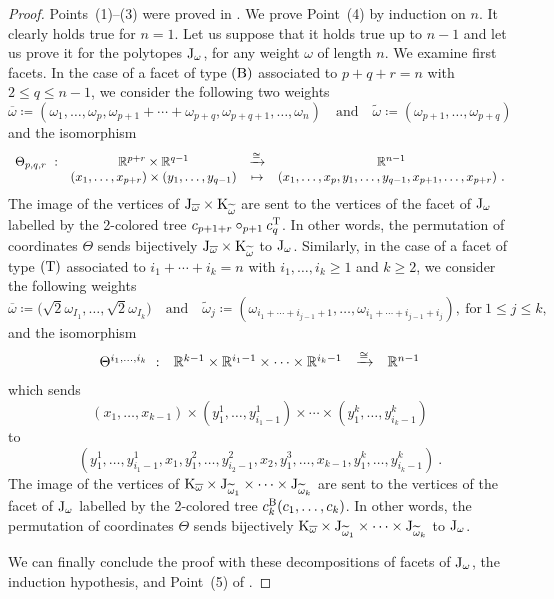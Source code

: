 \documentclass[twoside, 11pt]{amsart}
\theoremstyle{remark}
\begin{document}
\begin{proof}

Points~(1)--(3) were proved in \cite{Forcey08}.  
We prove Point~(4) by induction on $n$. 
It clearly holds true for $n=1$. Let us suppose that it holds true up to $n-1$ and let us prove it for the polytopes $\mathrm{J}_\omega$, for any weight $\omega$ of length $n$.
We examine first facets. 
In the case of a facet of type $(\mathrm{B})$ associated to $p+q+r=n$ with $2\leq q \leq n-1$, we consider the following two weights 
\[
\overline{\omega}\coloneqq (\omega_1, \ldots, \omega_{p}, \omega_{p+1}+\cdots+\omega_{p+q}, \omega_{p+q+1}, \ldots,  \omega_{n})
\quad \text{and} \quad 
\widetilde{\omega}\coloneqq (\omega_{p+1}, \ldots, \omega_{p+q})
\]
and the isomorphism 
\begin{align*}
\begin{array}{rccc}
\Theta_{p,q,r}\  : &  \mathbb{R}^{p+r}\times \mathbb{R}^{q-1} &\xrightarrow{\cong} &\mathbb{R}^{n-1}\\
&(x_1, \ldots, x_{p+r})\times (y_1, \ldots, y_{q-1}) & \mapsto& 
(x_1, \ldots, x_{p} , y_1, \ldots, y_{q-1}, x_{p+1}, \ldots, x_{p+r})\ .
\end{array}
\end{align*}
The image of the vertices of $\mathrm{J}_{\overline{\omega}}\times \mathrm{K}_{\widetilde{\omega}}$ are sent to the vertices of the facet of $\mathrm{J}_\omega$
labelled by the 2-colored tree $c_{p+1+r}\circ_{p+1} c^{\mathrm{T}}_q$. 
In other words, the permutation of coordinates $\Theta$ sends bijectively $\mathrm{J}_{\overline{\omega}}\times \mathrm{K}_{\widetilde{\omega}}$ to $\mathrm{J}_\omega$. 
Similarly, in the case of a facet of type $(\mathrm{T})$ associated to $i_1+\cdots+i_k=n$ with 
$i_1, \ldots,i_k\geq 1$ and $k\geq 2$, 
 we consider the following weights 
%
\[
\overline{\omega}\coloneqq \big(\sqrt{2}\omega_{I_1}, \ldots, \sqrt{2}\omega_{I_k}\big)
\quad \text{and} \quad 
\widetilde{\omega}_j\coloneqq (\omega_{i_1+\cdots+i_{j-1}+1}, \ldots, \omega_{i_1+\cdots+i_{j-1}+i_j}), \ \text{for}\ 1\leq j\leq k, 
\]
and the isomorphism 
\begin{align*}
\begin{array}{rccc}
\Theta^{i_1, \ldots, i_k}\  : &  \mathbb{R}^{k-1}\times \mathbb{R}^{i_1-1}\times \cdots \times \mathbb{R}^{i_k-1} &\xrightarrow{\cong} &\mathbb{R}^{n-1}
\end{array}
\end{align*}
which sends 
\[(x_1, \ldots, x_{k-1})\times (y_1^1, \ldots, y^1_{i_1-1})\times \cdots 
\times (y_1^k, \ldots, y^k_{i_k-1})\]
to 
\[(
y^1_1,\ldots, y^1_{i_1-1}, x_1, y^2_1, \ldots, y^2_{i_2-1}, x_2, y^3_1, \ldots, x_{k-1}, y^k_1, \ldots, y^k_{i_k-1}
)\ .\]
The image of the vertices of 
$\mathrm{K}_{\overline{\omega}}\times \mathrm{J}_{\widetilde{\omega}_1}\times \cdots \times \mathrm{J}_{\widetilde{\omega}_k}$ are sent to the vertices of the facet of $\mathrm{J}_\omega$
labelled by the 2-colored tree $c^{\mathrm{B}}_k(c_1, \ldots, c_k)$. In other words, the permutation of coordinates $\Theta$ sends bijectively $\mathrm{K}_{\overline{\omega}}\times \mathrm{J}_{\widetilde{\omega}_1}\times \cdots \times \mathrm{J}_{\widetilde{\omega}_k}$ to $\mathrm{J}_\omega$. 

We can finally conclude the proof with these decompositions of facets of $\mathrm{J}_\omega$, the induction hypothesis, and Point~(5) of \cite[Proposition~1]{MTTV19}.
\end{proof}
\end{document}
